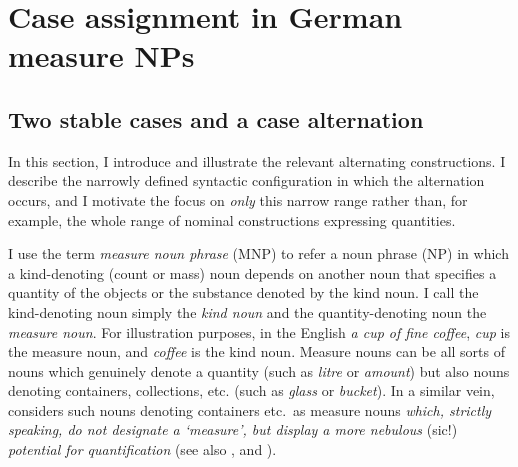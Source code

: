 \documentclass[USenglish]{article}
\begin{document}


\section{Case assignment in German measure NPs}
\label{sec:germanmeasurenps}


\subsection{Two stable cases and a case alternation}
\label{sec:descriptive}

In this section, I introduce and illustrate the relevant alternating constructions.
I describe the narrowly defined syntactic configuration in which the alternation occurs, and I motivate the focus on \textit{only} this narrow range rather than, for example, the whole range of nominal constructions expressing quantities.

I use the term \textit{measure noun phrase} (MNP) to refer a noun phrase (NP) in which a kind-denoting (count or mass) noun depends on another noun that specifies a quantity of the objects or the substance denoted by the kind noun.
I call the kind-denoting noun simply the \textit{kind noun} and the quantity-denoting noun the \textit{measure noun}.
For illustration purposes, in the English \textit{a cup of fine coffee}, \textit{cup} is the measure noun, and \textit{coffee} is the kind noun.
Measure nouns can be all sorts of nouns which genuinely denote a quantity (such as \textit{litre} or \textit{amount}) but also nouns denoting containers, collections, etc. (such as \textit{glass} or \textit{bucket}).
In a similar vein, \citet[284]{Brems2003} considers such nouns denoting containers etc.\ as measure nouns \textit{which, strictly speaking, do not designate a `measure', but display a more nebulous} (sic!) \textit{potential for quantification} (see also \citealp[530]{Koptjevskaja2001}, and \citealp[338]{Rutkowski2007}).
\end{document}
